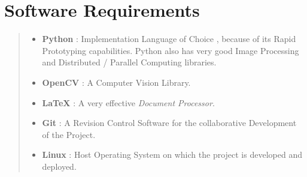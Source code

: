 \section*{Software Requirements}
\begin{quote}
\begin{itemize}
\item \textbf{Python} : Implementation Language of Choice , because of its Rapid Prototyping capabilities. Python also has very good Image Processing and Distributed / Parallel Computing libraries.
\item \textbf{OpenCV} : A Computer Vision Library.
\item \textbf{\LaTeX} : A very effective \textit{Document Processor}.
\item \textbf{Git} : A Revision Control Software for the collaborative Development of the Project.
\item \textbf{Linux} : Host Operating System on which the project is developed and deployed.
\end{itemize}
\end{quote}
